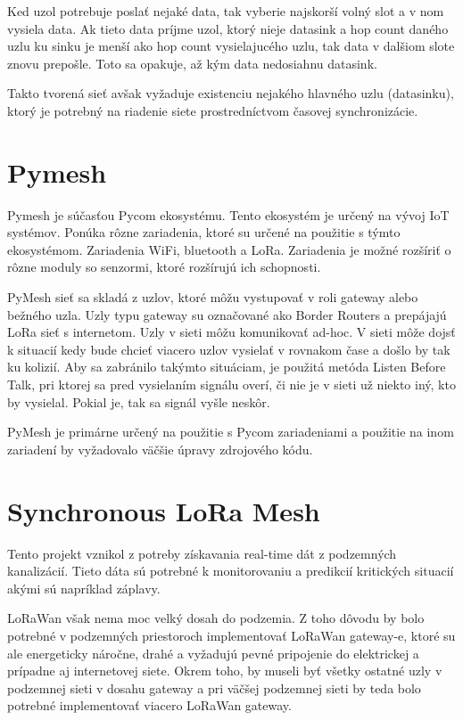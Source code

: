 \documentclass[slovak,master]{diploma}
\begin{document}
Ked uzol potrebuje poslať nejaké data, tak vyberie najskorší volný slot a v nom vysiela data. Ak tieto data príjme uzol, ktorý nieje datasink a 
hop count daného uzlu ku sinku je menší ako hop count vysielajucého uzlu, tak data v dalšiom slote znovu prepošle. Toto sa opakuje, až 
kým data nedosiahnu datasink.

Takto tvorená sieť avšak vyžaduje existenciu nejakého hlavného uzlu (datasinku), ktorý je potrebný na riadenie siete prostredníctvom časovej synchronizácie.

\section{Pymesh}
Pymesh je súčasťou Pycom \cite{pycom} ekosystému. Tento ekosystém je určený na vývoj IoT systémov. Ponúka rôzne zariadenia, ktoré su určené na použitie s týmto 
ekosystémom. Zariadenia WiFi, bluetooth a LoRa. Zariadenia je možné rozšíriť o rôzne moduly so senzormi, ktoré rozšírujú ich schopnosti. %

PyMesh sieť sa skladá z uzlov, ktoré môžu vystupovať v roli gateway alebo bežného uzla. Uzly typu gateway su označované ako Border Routers a prepájajú LoRa sieť s 
internetom. Uzly v sieti môžu komunikovať ad-hoc. V sieti môže dojsť k situacií kedy bude chcieť viacero uzlov vysielať v rovnakom čase a došlo by tak ku kolizií.
Aby sa zabránilo takýmto situáciam, je použitá metóda Listen Before Talk, pri ktorej sa pred vysielaním signálu overí, či nie je v sieti už niekto iný, kto by 
vysielal. Pokial je, tak sa signál vyšle neskôr.

PyMesh je primárne určený na použitie s Pycom zariadeniami a použitie na inom zariadení by vyžadovalo väčšie úpravy zdrojového kódu.

\section{Synchronous LoRa Mesh}

Tento projekt\cite{synchronouslorameshnetwork} vznikol z potreby získavania real-time dát z podzemných kanalizácií. Tieto dáta sú potrebné k monitorovaniu a predikcií kritických situacií akými 
sú napríklad záplavy.

LoRaWan však nema moc velký dosah do podzemia. Z toho dôvodu by bolo potrebné v podzemných priestoroch implementovať LoRaWan gateway-e, ktoré su ale energeticky náročne, drahé a vyžadujú 
pevné pripojenie do elektrickej a prípadne aj internetovej siete. Okrem toho, by museli byť všetky ostatné uzly v podzemnej sieti v dosahu gateway a pri väčšej podzemnej sieti 
by teda bolo potrebné implementovať viacero LoRaWan gateway.
\end{document}
